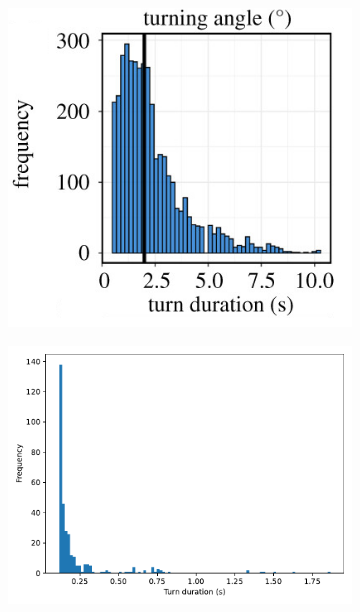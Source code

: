 \documentclass[9pt]{pnas-new}
\begin{document}
\begin{figure}[h]
    \begin{subfigure}[t]{.45\textwidth}
        \centering
        \includegraphics[width=0.8\linewidth]{empirical_turn_freq.png}
    \end{subfigure}
    \hspace{.5cm} %
    \begin{subfigure}[t]{.45\textwidth}
        \centering
        \includegraphics[width=1.02\linewidth]{avoid_direction_attack_peripheral/turn_dur_freq_2008.pdf}
    \end{subfigure}
    \hspace{.5cm} %
    \begin{subfigure}[t]{.45\textwidth}

\end{subfigure}
\end{figure}
\end{document}

